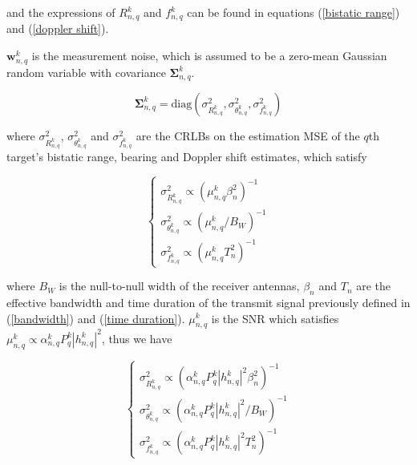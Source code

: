 \documentclass[12pt,journal,draftclsnofoot,onecolumn]{IEEEtran}
\begin{document}
and the expressions of $R_{n,q}^k$ and  $f_{n,q}^k$ can be found in equations (\ref{bistatic range}) and (\ref{doppler shift}).

$\mathbf{w}_{n,q}^k$ is the measurement noise, which is assumed to be a zero-mean Gaussian random variable with covariance $\mathbf{\Sigma}_{n,q}^k$. 

\begin{equation} 
\boldsymbol {\Sigma}_{n,q}^k = \text{diag}\left({\sigma _{R_{n,q}^k}^2,\sigma _{\theta _{n,q}^k}^2,\sigma _{f_{n,q}^k}^2} \right)
\label{measurement noise covariance}
\end{equation}

where $\sigma _{R_{n,q}^k}^2$, $\sigma _{\theta _{n,q}^k}^2$ and $\sigma _{f_{n,q}^k}^2$ are the CRLBs %
on the estimation MSE of the $q$th target's bistatic range, bearing and Doppler shift estimates, which satisfy

\begin{equation}
	\begin{cases}
		\sigma _{R_{n,q}^k}^2 \propto {\left(\mu_{n,q}^k{\beta _n^2} \right)^{ - 1}}\\ 
		\sigma _{\theta _{n,q}^k}^2 \propto {\left(\mu_{n,q}^k/{B_{W}} \right)^{ - 1}} \\
		\sigma _{f_{n,q}^k}^2 \propto {\left(\mu_{n,q}^kT_n^2 \right)^{ - 1}}
	\end{cases}
\label{R}	
\end{equation}

where $B_W$ is the null-to-null width of the receiver antennas, $\beta _n$ and $T_n$ are the effective bandwidth and time duration of the transmit signal previously defined in (\ref{bandwidth}) and (\ref{time duration}). $\mu_{n,q}^k$ is the SNR which satisfies $\mu_{n,q}^k \propto \alpha _{n,q}^k P_{q}^k {\left| {h_{n,q}^k} \right|}^2$, thus we have

\begin{equation}
     \begin{cases}
     	\sigma _{R_{n,q}^k}^2 \propto {\left({\alpha _{n,q}^k P_{q}^k {{\left| {h_{n,q}^k} \right|}^2}{\beta _n^2}} \right)^{ - 1}}\\ 
     	\sigma _{\theta _{n,q}^k}^2 \propto {\left({\alpha _{n,q}^k P_{q}^k {{\left| {h_{n,q}^k} \right|}^2}}/{B_{W}} \right)^{ - 1}} \\
     	\sigma _{f_{n,q}^k}^2 \propto {\left({\alpha _{n,q}^k P_{q}^k {{\left| {h_{n,q}^k} \right|}^2}T_n^2} \right)^{ - 1}}
     \end{cases}
\end{equation}
\end{document}
